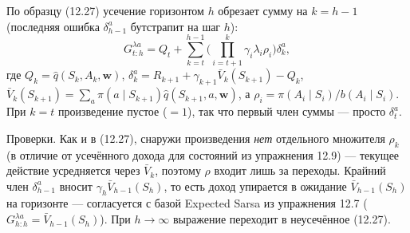 \begin{solution}
    По образцу (12.27) усечение горизонтом $h$ обрезает сумму на $k=h-1$
    (последняя ошибка $\delta_{h-1}^a$ бутстрапит на шаг $h$):
    \begin{equation*}
        G_{t:h}^{\lambda a} = Q_t + \sum_{k=t}^{h-1}\Big(\prod_{i=t+1}^{k}\gamma_i\lambda_i\rho_i\Big)\delta_k^a,
    \end{equation*}
    где $Q_k = \hat q(S_k,A_k,\mathbf w)$, $\delta_k^a = R_{k+1} + \gamma_{k+1}\bar V_k(S_{k+1}) - Q_k$,
    $\bar V_k(S_{k+1}) = \sum_a \pi(a\mid S_{k+1})\hat q(S_{k+1},a,\mathbf w)$, а
    $\rho_i = \pi(A_i\mid S_i)/b(A_i\mid S_i)$. При $k=t$ произведение пустое ($=1$),
    так что первый член суммы --- просто $\delta_t^a$.

    Проверки. Как и в (12.27), снаружи произведения \emph{нет} отдельного
    множителя $\rho_k$ (в отличие от усечённого дохода для состояний из
    упражнения 12.9) --- текущее действие усредняется через $\bar V_k$, поэтому
    $\rho$ входит лишь за переходы. Крайний член $\delta_{h-1}^a$ вносит
    $\gamma_h\bar V_{h-1}(S_h)$, то есть доход упирается в ожидание $\bar
    V_{h-1}(S_h)$ на горизонте --- согласуется с базой Expected Sarsa из упражнения
    12.7 ($G_{h:h}^{\lambda a}=\bar V_{h-1}(S_h)$). При $h\to\infty$ выражение
    переходит в неусечённое (12.27).
\end{solution}


